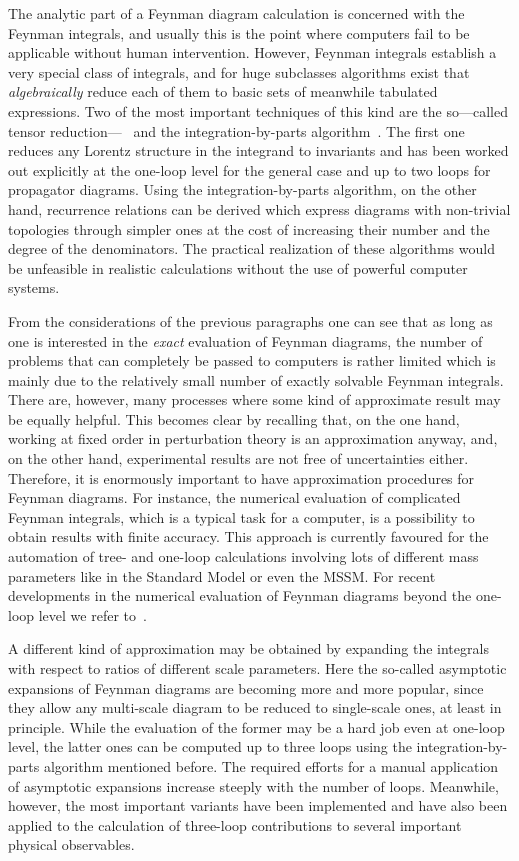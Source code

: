 The analytic part of a Feynman diagram calculation is concerned with the
Feynman integrals, and usually this is the point where computers fail to
be applicable without human intervention.  However, Feynman integrals
establish a very special class of integrals, and for huge subclasses
algorithms exist that {\em algebraically} reduce each of them to basic
sets of meanwhile tabulated expressions.  Two of the most important
techniques of this kind are the so---called tensor
reduction---~\cite{PasVel79} and the integration-by-parts
algorithm~\cite{CheTka81}.  The first one reduces any Lorentz structure
in the integrand to invariants and has been worked out explicitly at the
one-loop level for the general case and up to two loops for propagator
diagrams. Using the integration-by-parts algorithm, on the other hand,
recurrence relations can be derived which express diagrams with
non-trivial topologies through simpler ones at the cost of increasing
their number and the degree of the denominators.  The practical
realization of these algorithms would be unfeasible in realistic
calculations without the use of powerful computer systems.

From the considerations of the previous paragraphs one can see that as
long as one is interested in the {\it exact} evaluation of Feynman
diagrams, the number of problems that can completely be passed to
computers is rather limited which is mainly due to the relatively small
number of exactly solvable Feynman integrals. There are, however, many
processes where some kind of approximate result may be equally helpful.
This becomes clear by recalling that, on the one hand, working at fixed
order in perturbation theory is an approximation anyway, and, on the
other hand, experimental results are not free of uncertainties
either.
Therefore, it is enormously important to have approximation procedures
for Feynman diagrams. For instance, the numerical evaluation of
complicated Feynman integrals, which is a typical task for a computer,
is a possibility to obtain results with finite accuracy.
This approach is currently favoured for the automation of tree- and one-loop
calculations involving lots of different mass parameters like in the
Standard Model or even the MSSM. For recent developments in the
numerical evaluation of Feynman diagrams beyond the one-loop level
we refer to~\cite{numcalc}.

A different kind of approximation may be obtained by expanding the
integrals with respect to ratios of different scale parameters. Here the
so-called asymptotic expansions of Feynman diagrams are becoming more
and more popular, since they allow any multi-scale diagram to be reduced
to single-scale ones, at least in principle. While the evaluation of the
former may be a hard job even at one-loop level, the latter ones can be
computed up to three loops using the integration-by-parts algorithm
mentioned before.  The required efforts for a manual application of
asymptotic expansions increase steeply with the number of loops.
Meanwhile, however, the most important variants have been implemented
and have also been applied to the calculation of three-loop
contributions to several important physical observables.

